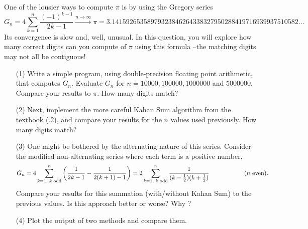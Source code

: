 One of the lousier ways to compute $\pi$ is by using the Gregory series
$$ G_n = 4 \sum_{k=1}^n\frac{(-1)^{k-1}}{2k-1} \xrightarrow{n\to \infty} \pi = 3.14159265358979323846264338327950288419716939937510582\hdots$$
Its convergence is slow and, well, unusual. In this question, you will explore how many correct digits can you compute of $\pi$ using this formula --the matching digits may not all be contiguous!

\begin{itemize}
\item[(1)] Write a simple program, using double-precision floating point arithmetic, that computes $G_n$. Evaluate $G_n$ for $n = 10000, 100000, 1000000$ and $5000000$. Compare your results to $\pi$. How many digits match?
\item[(2)] Next,  implement  the  more  careful  Kahan  Sum  algorithm  from  the  textbook (.2), and compare your results for the $n$ values used previously. How many digits match?
\item[(3)]One might be bothered by the alternating nature of this series.  Consider the modified non-alternating series where each term is a positive number,
$$ G_n = 4 \sum_{k=1\text{, $k$ odd}}^n\left(\frac{1}{2k-1} - \frac{1}{2(k+1)-1}\right) = 2\sum_{k=1\text{, $k$ odd}}^n\frac{1}{(k - \frac{1}{2})(k + \frac{1}{2})} \text{\hspace{2cm}($n$ even)}.$$  
  Compare your results for this summation (with/without Kahan Sum) to the previous values. Is this approach better or worse? Why ?
\item[(4)] Plot the output of two methods and compare them.
\end{itemize}


